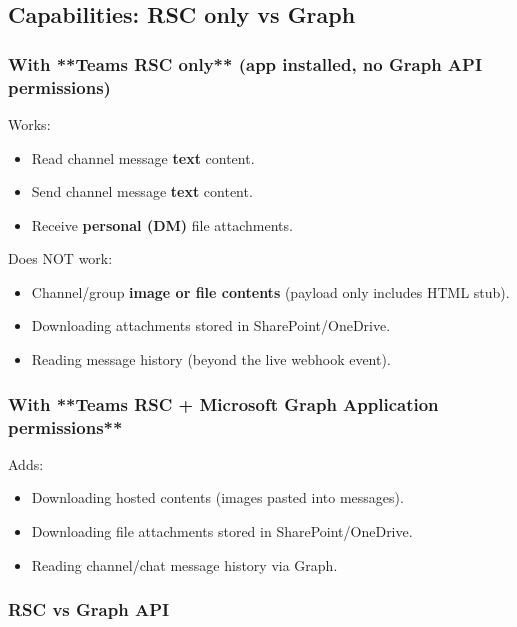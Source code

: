 \subsection{Capabilities: RSC only vs Graph}


\subsubsection{With **Teams RSC only** (app installed, no Graph API permissions)}


Works:

\begin{itemize}
  \item Read channel message \textbf{text} content.
  \item Send channel message \textbf{text} content.
  \item Receive \textbf{personal (DM)} file attachments.
\end{itemize}


Does NOT work:

\begin{itemize}
  \item Channel/group \textbf{image or file contents} (payload only includes HTML stub).
  \item Downloading attachments stored in SharePoint/OneDrive.
  \item Reading message history (beyond the live webhook event).
\end{itemize}


\subsubsection{With **Teams RSC + Microsoft Graph Application permissions**}


Adds:

\begin{itemize}
  \item Downloading hosted contents (images pasted into messages).
  \item Downloading file attachments stored in SharePoint/OneDrive.
  \item Reading channel/chat message history via Graph.
\end{itemize}


\subsubsection{RSC vs Graph API}




